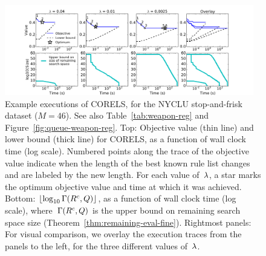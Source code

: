 \begin{figure}[t!]
\begin{center}
\includegraphics[trim={35mm 0mm 35mm 15mm},
width=0.97\textwidth]{figs/weapon_reg-execution.pdf}
\end{center}
\vspace{-5mm}
\caption{Example executions of CORELS, for the NYCLU stop-and-frisk dataset (${M = 46}$).
%
See also Table~\ref{tab:weapon-reg} and Figure~\ref{fig:queue-weapon-reg}.
%
Top: Objective value (thin line) and lower bound (thick line) for CORELS,
as a function of wall clock time (log scale).
%
Numbered points along the trace of the objective value
indicate when the length of the best known rule list changes
and are labeled by the new length.
%
For each value of~${\lambda}$, a star marks the optimum objective value
and time at which it was achieved.
%
Bottom: $\lfloor \log_{10} \Gamma({R^c}, Q) \rfloor$,
as a function of wall clock time (log scale),
where~$\Gamma({R^c}, Q)$
is the upper bound on remaining search space size
(Theorem~\ref{thm:remaining-eval-fine}).
%
Rightmost panels: For visual comparison, we overlay the execution traces
from the panels to the left, for the three different values of~${\lambda}$.
}
\label{fig:weapon-reg-execution}
\end{figure}

